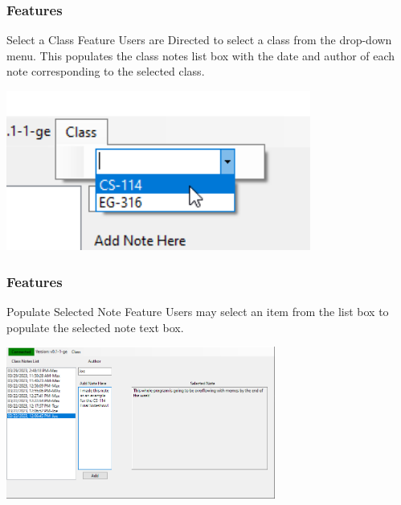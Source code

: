 \documentclass[aspectratio=169]{beamer}
\begin{document}
\begin{frame}
    \frametitle{Features}

    \begin{block}{\centering Select a Class Feature}
        \centering Users are Directed to select a class from the drop-down menu. This populates the class notes list box with the date and author of each note corresponding to the selected class.
    \end{block}

    \centering \includegraphics [width=10cm] {select}
    
\end{frame}

\begin{frame}
    \frametitle{Features}

    \begin{block}{\centering Populate Selected Note Feature}
        \centering Users may select an item from the list box to populate the selected note text box.
    \end{block}

    \centering \includegraphics[height=5cm]{createNew}
    
\end{frame}
\end{document}

